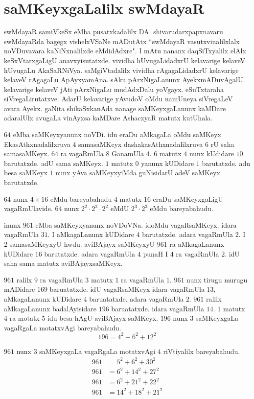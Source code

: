 \chapter{saMKeyxgaLalilx swMdayaR}

swMdayaR samiVkeSx eMba pusatxkadalilx DA| shivarudarxpapxnavaru swMdayaRda bagegx vishelxVSaNe mADutAtx ``swMdayaR vasutxvinalilxlalx noVDuvavara kaNiNxnalilxde eMdidAdxre". I mAtu nananx daqSiTxyalilx elAlx keSxVtarxgaLigU anavxyisutatxde. vividha hUvugaLidadxrU kelavarige kelaveV hUvugaLu AkaSaRNiVya. saMgiVtadalilx vividha rAgagaLidadxrU kelavarige kelaveV rAgagaLu ApAyxyamAna. sAku pArxNigaLanunx AyekxmADuvAgalU kelavarige kelaveV jAti pArxNigaLu mudAdxDalu yoVgayx. eSuTxtaraha siVregaLirutatxve. AdarU kelavarige yAvudoV oMdu namUneya siVregaLeV avara Ayekx. gaNita shikaSxkanAda nanage saMKeyxgaLanunx kaMDare adaralUlx avugaLa vinAyxsa kaMDare AshacxyaR matutx kutUhala.

$64$ eMba saMKeyxyanunx noVDi. idu eraDu aMkagaLa oMdu saMKeyx EkasAthxnadalilxruva $4$ samasaMKeyx dashakasAthxnadalilxruva $6$ rU saha samasaMKeyx. $64$ ra vagaRmUla $8$ GanamUla $4$. $6$ matutx $4$ nunx kUdidare $10$ barutatxde. adU sama saMKeyx. $1$ matutx $0$ yanunx kUDidare $1$ barutatxde. adu besa saMKeyx $1$ nunx yAva saMKeyxyiMda guNisidarU adeV saMKeyx barutatxde.

$64$ nunx $4\times 16$ eMdu bareyabahudu $4$ matutx $16$ eraDu saMKeyxgaLigU vagaRmUlavide. $64$ nunx $2^2\cdot 2^2\cdot 2^2$ eMdU $2^3\cdot2^3$ eMdu bareyabahudu.

inunx $961$ eMba saMKeyxyanunx noVDoVNa. idoMdu vagaRsaMKeyx. idara vagaRmUla $31$. I aMkagaLanunx kUDidare $4$ barutatxde. adara vagaRmUla $2$. I $2$ samasaMKeyxyU hwdu. aviBAjayx saMKeyxyU $961$ ra aMkagaLanunx kUDidare $16$ barutatxde. adara vagaRmUla $4$ punaH I $4$ ra vagaRmUla $2$. idU saha sama matutx aviBAjayxsaMKeyx.

$961$ ralilx $9$ ra vagaRmUla $3$ matutx $1$ ra vagaRmUla $1$. $961$ nunx tirugu murugu mADidare $169$ baruatatxde. idU vagaRsaMKeyx idara vagaRmUla $13$, aMkagaLanunx kUDidare $4$ baruatatxde. adara vagaRmUla $2$. $961$ ralilx aMkagaLanunx badalAyisidare $196$ baruatatxde. idara vagaRmUla $14$. $1$ matutx $4$ ra motatx $5$ idu besa hAgU aviBAjayx saMKeyx. $196$ nunx $3$ saMKeyxgaLa vagaRgaLa motatxvAgi bareyabahudu.
$$
196 = 4^2+6^2+12^2
$$

$961$ nunx $3$ saMKeyxgaLa vagaRgaLa motatxvAgi $4$ riVtiyalilx bareyabahudu.
\begin{align*}
961 &= 5^2+6^2+30^2\\
961 &= 6^2+14^2+27^2\\
961 &= 6^2+21^2+22^2\\
961 &= 14^2+18^2+21^2
\end{align*}

